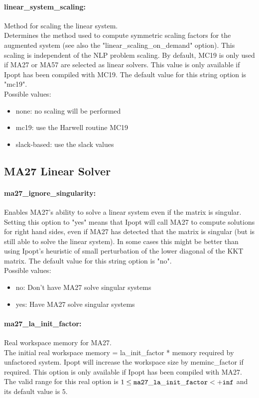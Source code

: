 \paragraph{linear\_system\_scaling:}\label{sec:linear_system_scaling} Method for scaling the linear system. $\;$ \\
 Determines the method used to compute symmetric
scaling factors for the augmented system (see
also the "linear\_scaling\_on\_demand" option). 
This scaling is independent of the NLP problem
scaling.  By default, MC19 is only used if MA27
or MA57 are selected as linear solvers. This
value is only available if Ipopt has been
compiled with MC19.
The default value for this string option is "mc19".
\\ 
Possible values:
\begin{itemize}
   \item none: no scaling will be performed
   \item mc19: use the Harwell routine MC19
   \item slack-based: use the slack values
\end{itemize}

\subsection{MA27 Linear Solver}
\label{sec:MA27_Linear_Solver}
\paragraph{ma27\_ignore\_singularity:}\label{sec:ma27_ignore_singularity} Enables MA27's ability to solve a linear system even if the matrix is singular. $\;$ \\
 Setting this option to "yes" means that Ipopt
will call MA27 to compute solutions for right
hand sides, even if MA27 has detected that the
matrix is singular (but is still able to solve
the linear system). In some cases this might be
better than using Ipopt's heuristic of small
perturbation of the lower diagonal of the KKT
matrix.
The default value for this string option is "no".
\\ 
Possible values:
\begin{itemize}
   \item no: Don't have MA27 solve singular systems
   \item yes: Have MA27 solve singular systems
\end{itemize}

\paragraph{ma27\_la\_init\_factor:}\label{sec:ma27_la_init_factor} Real workspace memory for MA27. $\;$ \\
 The initial real workspace memory =
la\_init\_factor * memory required by unfactored
system. Ipopt will increase the workspace size by
meminc\_factor if required.  This option is only
available if  Ipopt has been compiled with MA27. The valid range for this real option is 
$1 \le {\tt ma27\_la\_init\_factor } <  {\tt +inf}$
and its default value is $5$.


